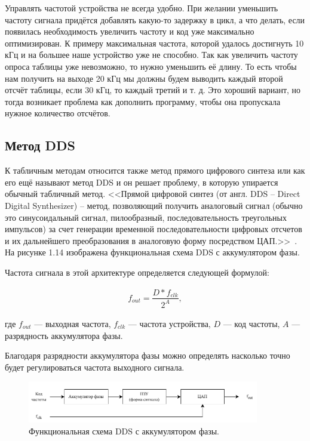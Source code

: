 	Управлять частотой устройства не всегда удобно. При желании уменьшить частоту сигнала придётся добавлять какую-то задержку в цикл, а что делать, если появилась необходимость увеличить частоту и код уже максимально оптимизирован. К примеру максимальная частота, которой удалось достигнуть 10 кГц и на большее наше устройство уже не способно. Так как увеличить частоту опроса таблицы уже невозможно, то нужно уменьшить её длину. То есть чтобы нам получить на выходе 20 кГц мы должны будем выводить каждый второй отсчёт таблицы, если 30 кГц, то каждый третий и т. д. Это хороший вариант, но тогда возникает проблема как дополнить программу, чтобы она пропускала нужное количество отсчётов.



\subsection{Метод DDS}	

	К табличным методам относится также метод прямого цифрового синтеза или как его ещё называют метод DDS и он решает проблему, в которую упирается обычный табличный метод. <<Прямой цифровой синтез (от англ. DDS – Direct Digital Synthesizer) – метод, позволяющий получить аналоговый сигнал (обычно это синусоидальный сигнал, пилообразный, последовательность треугольных импульсов) за счет генерации временной последовательности цифровых отсчетов и их дальнейшего преобразования в аналоговую форму посредством ЦАП.>>~\cite{leso}. На рисунке 1.14 изображена функциональная схема DDS с аккумулятором фазы.
	
	Частота сигнала в этой архитектуре определяется следующей формулой:
	
	\begin{gather}
	f_{out}=\dfrac{D * f_{clk}}{2^{A}},
	\end{gather}
		
	где $f_{out}$ --- выходная частота, $f_{clk}$ --- частота устройства, $D$ --- код частоты, $A$ --- разрядность аккумулятора фазы.
	
	Благодаря разрядности аккумулятора фазы можно определять насколько точно будет регулироваться частота выходного сигнала.
	
	\begin{figure}[H]
    \centering
    \includegraphics[width=0.9\textwidth]{../image/dds_func.pdf}
    \caption{Функциональная схема DDS с аккумулятором фазы.}
	\end{figure}
	
